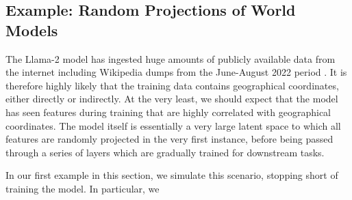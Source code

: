 \documentclass{article}
\theoremstyle{plain}
\theoremstyle{definition}
\theoremstyle{remark}
\begin{document}
\subsection{Example: Random Projections of World Models}\label{example-deep-learning}

The Llama-2 model has ingested huge amounts of publicly available data from the internet including Wikipedia dumps from the June-August 2022 period \citep{touvron2023llama}. It is therefore highly likely that the training data contains geographical coordinates, either directly or indirectly. At the very least, we should expect that the model has seen features during training that are highly correlated with geographical coordinates. The model itself is essentially a very large latent space to which all features are randomly projected in the very first instance, before being passed through a series of layers which are gradually trained for downstream tasks.

In our first example in this section, we simulate this scenario, stopping short of training the model. In particular, we
\end{document}

